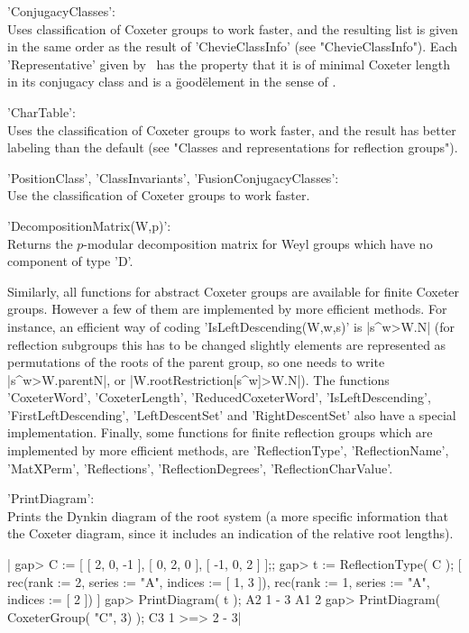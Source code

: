 'ConjugacyClasses':\\   Uses  classification of  Coxeter  groups  to work
     faster,  and the  resulting  list is  given in  the  same order  as
     the  result  of  'ChevieClassInfo'  (see  "ChevieClassInfo").  Each
     'Representative' given by  \CHEVIE\ has the property that  it is of
     minimal Coxeter  length in  its conjugacy class  and is  a \"good\"
     element in the sense of \cite{GM97}.

'CharTable':\\ Uses the classification of  Coxeter groups to work faster,
     and   the result has better  labeling  than the default (see
     "Classes and representations for reflection groups").

'PositionClass',  'ClassInvariants', 'FusionConjugacyClasses':\\ Use  the
     classification     of    Coxeter   groups     to    work     faster.

'DecompositionMatrix(W,p)':\\  Returns the $p$-modular decomposition matrix
for Weyl groups which have no component of type 'D'.

Similarly,  all  functions  for  abstract  Coxeter groups are available for
finite  Coxeter  groups.  However  a  few  of  them are implemented by more
efficient methods. For instance, an efficient way of coding
'IsLeftDescending(W,w,s)'  is |s^w>W.N| (for  reflection subgroups this has
to  be changed slightly\:  elements are represented  as permutations of the
roots  of  the  parent  group,  so  one  needs to write |s^w>W.parentN|, or
|W.rootRestriction[s^w]>W.N|). The functions 'CoxeterWord',
'CoxeterLength', 'ReducedCoxeterWord', 'IsLeftDescending',
'FirstLeftDescending',  'LeftDescentSet' and 'RightDescentSet'  also have a
special  implementation.  Finally,  some  functions  for  finite reflection
groups which are implemented by more efficient methods, are
'ReflectionType',      'ReflectionName',     'MatXPerm',     'Reflections',
'ReflectionDegrees', 'ReflectionCharValue'.

'PrintDiagram':\\ Prints the Dynkin diagram of the root system (a more
  specific  information  that  the  Coxeter  diagram,  since it includes an
  indication of the relative root lengths).

|    gap> C := [ [ 2, 0, -1 ], [ 0, 2, 0 ], [ -1, 0, 2 ] ];;
    gap> t := ReflectionType( C );
    [ rec(rank    := 2,
          series  := "A",
          indices := [ 1, 3 ]), rec(rank    := 1,
          series  := "A",
          indices := [ 2 ]) ]
    gap> PrintDiagram( t );
    A2 1 - 3
    A1 2
    gap> PrintDiagram( CoxeterGroup( "C", 3) );
    C3 1 >=> 2 - 3|

